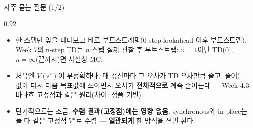 \begin{frame}{자주 묻는 질문 (1/2)}
\begin{center}\begin{varwidth}{0.92\textwidth}
  \begin{itemize}
    \item {}
      한 스텝만 앞을 내다보고 바로 부트스트래핑(0-step lookahead 이후
      부트스트랩). Week 7의 n-step TD는 $n$ 스텝 실제 관찰 후
      부트스트랩: $n = 1$이면 TD(0), $n = \infty$(끝까지)면 사실상 MC.
    \item {}
      처음엔 $V(s')$이 부정확하나, 매 갱신마다 그 오차가 TD 오차만큼
      줄고, 줄어든 값이 다시 다음 목표값에 쓰이면서 오차가 \textbf{전체적으로}
      계속 줄어든다 --- Week 4.3 바나흐 고정점과 같은 원리(차이: 샘플 기반).
    \item {}
      단기적으로는 조금, \textbf{수렴 결과(고정점)에는 영향 없음}.
      synchronous와 in-place는 둘 다 같은 고정점 $V^\pi$로 수렴 ---
      \textbf{일관되게} 한 방식을 쓰면 된다.
  \end{itemize}
\end{varwidth}\end{center}
\end{frame}
